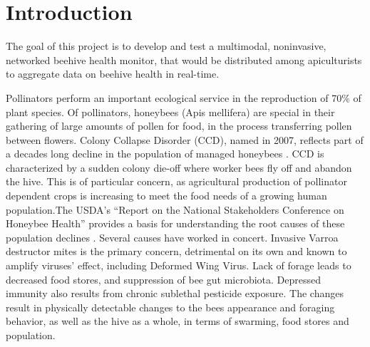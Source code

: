 

\section{Introduction}

The goal of this project is to develop and test a multimodal, noninvasive, networked beehive health monitor, that would be distributed among apiculturists to aggregate data on beehive health in real-time.

Pollinators perform an important ecological service in the reproduction of 70\% of plant species. Of pollinators, honeybees (Apis mellifera) are special in their gathering of large amounts of pollen for food, in the process transferring pollen between flowers. Colony Collapse Disorder (CCD), named in 2007, reflects part of a decades long decline in the population of managed honeybees \cite{spivak2010plight}. CCD is characterized by a sudden colony die-off where worker bees fly off and abandon the hive. This is of particular concern, as agricultural production of pollinator dependent crops is increasing to meet the food needs of a growing human population.The USDA’s “Report on the National Stakeholders Conference on Honeybee Health” provides a basis for understanding the root causes of these population declines \cite{national2012report}. Several causes have worked in concert. Invasive Varroa destructor mites is the primary concern, detrimental on its own and known to amplify viruses' effect, including Deformed Wing Virus. Lack of forage  leads to decreased food stores, and suppression of bee gut microbiota. Depressed immunity also results from chronic sublethal pesticide exposure. The changes result in physically detectable changes to the bees appearance and foraging behavior, as well as the hive as a whole, in terms of swarming, food stores and population. 


